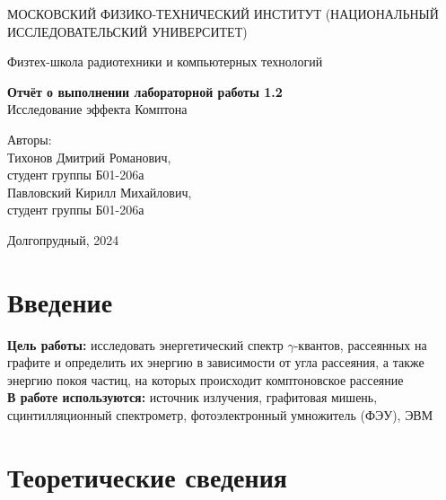 \documentclass[a4paper, 12pt]{article}
\begin{document}
    \begin{titlepage}
	\begin{center}
            {\large МОСКОВСКИЙ ФИЗИКО-ТЕХНИЧЕСКИЙ ИНСТИТУТ (НАЦИОНАЛЬНЫЙ ИССЛЕДОВАТЕЛЬСКИЙ УНИВЕРСИТЕТ)}
	\end{center}
 
	\begin{center}
		{\large Физтех-школа радиотехники и компьютерных технологий}
	\end{center}
	
	\vspace{8cm}
	{\LARGE
		\begin{center}
                {\bf Отчёт о выполнении лабораторной работы 1.2}\\
                Исследование эффекта Комптона
		\end{center}
	}
	\vspace{5cm}
	\begin{flushright}
		{\Large Авторы: \\ 
        Тихонов Дмитрий Романович, \\ студент группы Б01-206а \\
        Павловский Кирилл Михайлович, \\ студент группы Б01-206а}
	\end{flushright}
	\vspace{4cm}
	\begin{center}
		\Large Долгопрудный, 2024
	\end{center}
    \end{titlepage}


    \section{Введение}

    \noindent \textbf{Цель работы:} исследовать энергетический спектр $\gamma$-квантов, рассеянных на графите и определить их энергию в зависимости от угла рассеяния, а также энергию покоя частиц, на которых происходит комптоновское рассеяние \\

    \noindent \textbf{В работе используются:} источник излучения, графитовая мишень, сцинтилляционный спектрометр, фотоэлектронный умножитель (ФЭУ), ЭВМ
    
    \section{Теоретические сведения}
    
\end{document}
